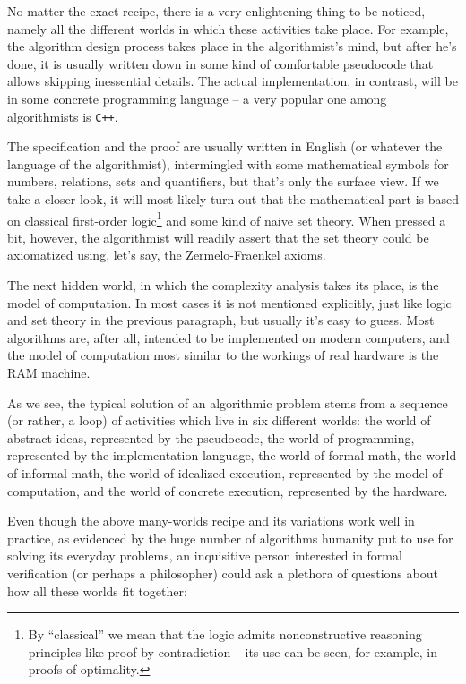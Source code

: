 \documentclass[declaration,mgr,english,shortabstract]{iithesis}
\newcommand{\m}[1]{\texttt{#1}}
\begin{document}
No matter the exact recipe, there is a very enlightening thing to be noticed, namely all the different worlds in which these activities take place. For example, the algorithm design process takes place in the algorithmist's mind, but after he's done, it is usually written down in some kind of comfortable pseudocode that allows skipping inessential details. The actual implementation, in contrast, will be in some concrete programming language -- a very popular one among algorithmists is \m{C++}.

The specification and the proof are usually written in English (or whatever the language of the algorithmist), intermingled with some mathematical symbols for numbers, relations, sets and quantifiers, but that's only the surface view. If we take a closer look, it will most likely turn out that the mathematical part is based on classical first-order logic\footnote{By ``classical'' we mean that the logic admits nonconstructive reasoning principles like proof by contradiction \cite{ProofByContradiction} -- its use can be seen, for example, in proofs of optimality.} and some kind of naive set theory. When pressed a bit, however, the algorithmist will readily assert that the set theory could be axiomatized using, let's say, the Zermelo-Fraenkel axioms.

The next hidden world, in which the complexity analysis takes its place, is the model of computation. In most cases it is not mentioned explicitly, just like logic and set theory in the previous paragraph, but usually it's easy to guess. Most algorithms are, after all, intended to be implemented on modern computers, and the model of computation most similar to the workings of real hardware is the RAM machine.

As we see, the typical solution of an algorithmic problem stems from a sequence (or rather, a loop) of activities which live in six different worlds: the world of abstract ideas, represented by the pseudocode, the world of programming, represented by the implementation language, the world of formal math, the world of informal math, the world of idealized execution, represented by the model of computation, and the world of concrete execution, represented by the hardware.

Even though the above many-worlds recipe and its variations work well in practice, as evidenced by the huge number of algorithms humanity put to use for solving its everyday problems, an inquisitive person interested in formal verification (or perhaps a philosopher) could ask a plethora of questions about how all these worlds fit together:
\end{document}
